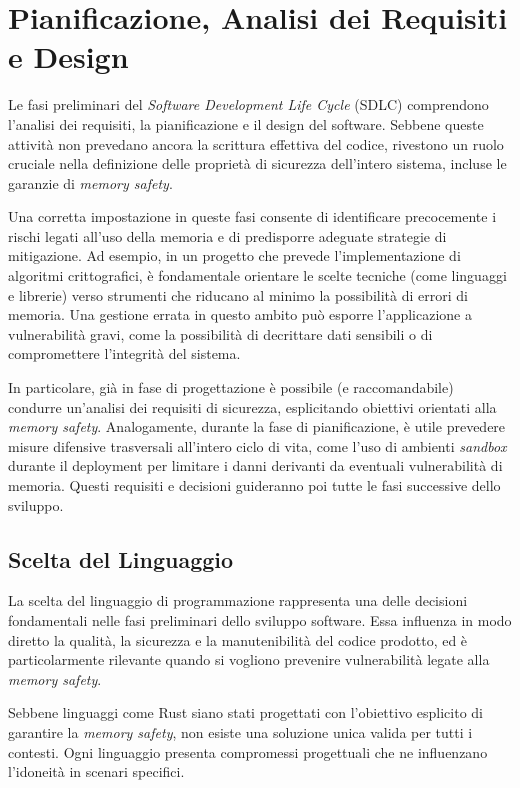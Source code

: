 \section{Pianificazione, Analisi dei Requisiti e Design}
\label{sec:planning_requirements_design}

Le fasi preliminari del \textit{Software Development Life Cycle} (SDLC)
comprendono l'analisi dei requisiti, la pianificazione e il design del software.
Sebbene queste attività non prevedano ancora la scrittura effettiva del codice, rivestono
un ruolo cruciale nella definizione delle proprietà di sicurezza dell'intero sistema,
incluse le garanzie di \textit{memory safety}.

Una corretta impostazione in queste fasi consente di identificare precocemente i
rischi legati all'uso della memoria e di predisporre adeguate strategie di mitigazione.
Ad esempio, in un progetto che prevede l'implementazione di algoritmi crittografici,
è fondamentale orientare le scelte tecniche (come linguaggi e librerie) verso
strumenti che riducano al minimo la possibilità di errori di memoria. Una gestione
errata in questo ambito può esporre l'applicazione a vulnerabilità gravi, come
la possibilità di decrittare dati sensibili o di compromettere l'integrità del
sistema.

In particolare, già in fase di progettazione è possibile (e raccomandabile) condurre
un'analisi dei requisiti di sicurezza, esplicitando obiettivi orientati alla
\textit{memory safety}. Analogamente, durante la fase di pianificazione, è utile
prevedere misure difensive trasversali all'intero ciclo di vita, come l'uso di ambienti
\textit{sandbox} durante il deployment per limitare i danni derivanti da
eventuali vulnerabilità di memoria. Questi requisiti e decisioni guideranno poi tutte
le fasi successive dello sviluppo.

\subsection{Scelta del Linguaggio}
\label{sec:linguaggio}

La scelta del linguaggio di programmazione rappresenta una delle decisioni
fondamentali nelle fasi preliminari dello sviluppo software. Essa influenza in modo
diretto la qualità, la sicurezza e la manutenibilità del codice prodotto, ed è particolarmente
rilevante quando si vogliono prevenire vulnerabilità legate alla \textit{memory
safety}.

Sebbene linguaggi come Rust siano stati progettati con l'obiettivo esplicito di
garantire la \textit{memory safety}, non esiste una soluzione unica valida per
tutti i contesti. Ogni linguaggio presenta compromessi progettuali che ne influenzano
l'idoneità in scenari specifici.

